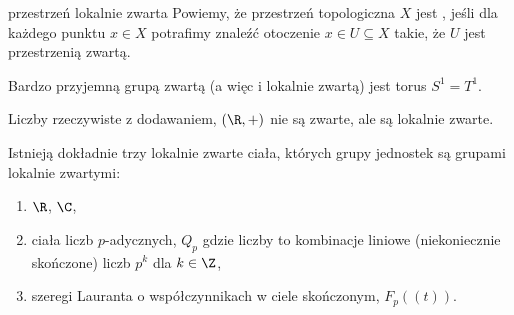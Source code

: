 \begin{definition}{przestrzeń lokalnie zwarta}{}
  Powiemy, że przestrzeń topologiczna $X$ jest , jeśli dla każdego punktu $x\in X$ potrafimy znaleźć otoczenie $x\in U\subseteq X$ takie, że $U$ jest przestrzenią zwartą.
\end{definition}

\begin{example}[m]
\item Bardzo przyjemną grupą zwartą (a więc i lokalnie zwartą) jest torus $S^1=T^1$.
\item Liczby rzeczywiste z dodawaniem, $(\R, +)$ nie są zwarte, ale są lokalnie zwarte.
\item Istnieją dokładnie trzy lokalnie zwarte ciała, których grupy jednostek są grupami lokalnie zwartymi:
  \begin{enumerate}
    \item $\R$, $\C$,
    \item ciała liczb $p$-adycznych, $Q_p$ gdzie liczby to kombinacje liniowe (niekoniecznie skończone) liczb $p^{k}$ dla $k\in\Z$,
    \item szeregi Lauranta o współczynnikach w ciele skończonym, $F_p((t))$.
  \end{enumerate}
\end{example}

%


%









